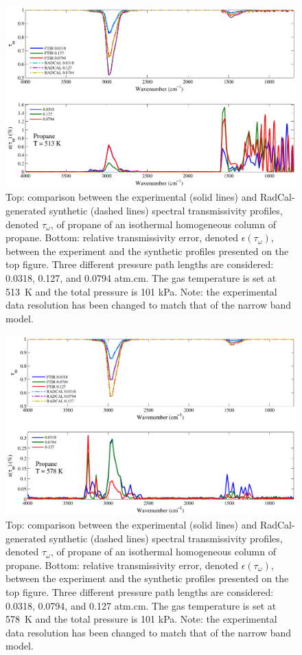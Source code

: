\begin{figure}[p]
\includegraphics[width=\textwidth]{../Verification/Results_Test2/Propane_513.pdf}
\caption{Top: comparison between the experimental (solid lines) and RadCal-generated synthetic (dashed lines) spectral transmissivity profiles, denoted $\tau_{\omega}$, of propane of an isothermal homogeneous column of propane. Bottom: relative transmissivity error, denoted $\epsilon{(\tau_{\omega})}$, between the experiment and the synthetic profiles presented on the top figure. Three different pressure path lengths are considered: 0.0318, 0.127, and 0.0794 atm.cm. The gas temperature is set at 513~K and the total pressure is 101 kPa. Note: the experimental data resolution has been changed to match that of the narrow band model. \label{fig:propane_Verify_513K}}
\end{figure}

\begin{figure}[p]
\includegraphics[width=\textwidth]{../Verification/Results_Test2/Propane_578.pdf}
\caption{Top: comparison between the experimental (solid lines) and RadCal-generated synthetic (dashed lines) spectral transmissivity profiles, denoted $\tau_{\omega}$, of propane of an isothermal homogeneous column of propane. Bottom: relative transmissivity error, denoted $\epsilon{(\tau_{\omega})}$, between the experiment and the synthetic profiles presented on the top figure. Three different pressure path lengths are considered: 0.0318, 0.0794, and 0.127 atm.cm. The gas temperature is set at 578~K and the total pressure is 101 kPa. Note: the experimental data resolution has been changed to match that of the narrow band model. \label{fig:propane_Verify_578K}}
\end{figure}

